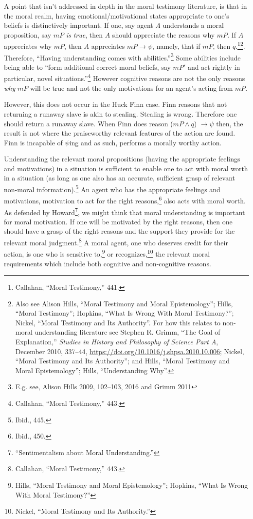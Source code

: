 \documentclass[phdthesis,12pt,final]{wuthesis}
\theoremstyle{definition}
\theoremstyle{definition}
\theoremstyle{definition}
\theoremstyle{definition}
\theoremstyle{remark}
\begin{document}
A point that isn't addressed in depth in the moral testimony literature, is that in the moral realm, having emotional/motivational states appropriate to one's beliefs is distinctively important. If one, say agent \emph{A} understands a moral proposition, say \(mP\) \emph{is true}, then \(A\) should appreciate the reasons why \(mP\). If \(A\) appreciates why \(mP\), then \(A\) appreciates \(mP \rightarrow \psi\), namely, that if \(mP\), then \(q\).\footnote{Callahan, {``Moral {Testimony},''} 441.}\footnote{Also see Alison Hills, {``Moral Testimony and Moral Epistemology''}; Hills, {``Moral {Testimony}''}; Hopkins, {``What {Is Wrong With Moral Testimony}?''}; Nickel, {``Moral {Testimony} and Its {Authority}''}. For how this relates to non-moral understanding literature see Stephen R. Grimm, {``The Goal of Explanation,''} \emph{Studies in History and Philosophy of Science Part A}, December 2010, 337--44, \url{https://doi.org/10.1016/j.shpsa.2010.10.006}; Nickel, {``Moral {Testimony} and Its {Authority}''}; and Hills, {``Moral Testimony and Moral Epistemology''}; Hills, {``Understanding {Why}''}.}. Therefore, ``Having understanding comes with abilities.''\footnote{E.g. see, Alison Hills 2009, 102--103, 2016 and Grimm 2011} Some abilities include being able to ``form additional correct moral beliefs, say \(mP'\) and act rightly in particular, novel situations.''\footnote{Callahan, {``Moral {Testimony},''} 443.} However cognitive reasons are not the only reasons \emph{why} \(mP\) will be true and not the only motivations for an agent's acting from \(mP\).

However, this does not occur in the Huck Finn case. Finn reasons that not returning a runaway slave is akin to stealing. Stealing is wrong. Therefore one should return a runaway slave. When Finn does reason (\(mP \land q\)) \(\rightarrow \psi\) then, the result is not where the praiseworthy relevant features of the action are found. Finn is incapable of \(\psi\)ing and as such, performs a morally worthy action.

Understanding the relevant moral propositions (having the appropriate feelings and motivations) in a situation is sufficient to enable one to act with moral worth in a situation (as long as one also has an accurate, sufficient grasp of relevant non-moral information).\footnote{Ibid., 445.} An agent who has the appropriate feelings and motivations, motivation to act for the right reasons,\footnote{Ibid., 450.} also acts with moral worth. As defended by Howard\footnote{{``Sentimentalism about {Moral Understanding}.''}}, we might think that moral understanding is important for moral motivation. If one will be motivated by the right reasons, then one should have a grasp of the right reasons and the support they provide for the relevant moral judgment.\footnote{Callahan, {``Moral {Testimony},''} 443.} A moral agent, one who deserves credit for their action, is one who is sensitive to,\footnote{Hills, {``Moral Testimony and Moral Epistemology''}; Hopkins, {``What {Is Wrong With Moral Testimony}?''}} or recognizes,\footnote{Nickel, {``Moral {Testimony} and Its {Authority}.''}} the relevant moral requirements which include both cognitive and non-cognitive reasons.
\end{document}
